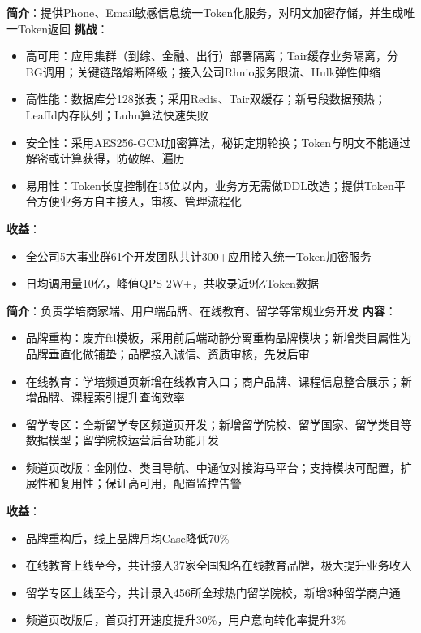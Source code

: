 \documentclass{resume}
\begin{document}
    \begin{onehalfspacing}
        \textbf{简介}：提供Phone、Email敏感信息统一Token化服务，对明文加密存储，并生成唯一Token返回\newline
        \textbf{挑战}：
        \begin{itemize}
            \item 高可用：应用集群（到综、金融、出行）部署隔离；Tair缓存业务隔离，分BG调用；关键链路熔断降级；接入公司Rhnio服务限流、Hulk弹性伸缩
            \item 高性能：数据库分128张表；采用Redis、Tair双缓存；新号段数据预热；LeafId内存队列；Luhn算法快速失败
            \item 安全性：采用AES256-GCM加密算法，秘钥定期轮换；Token与明文不能通过解密或计算获得，防破解、遍历
            \item 易用性：Token长度控制在15位以内，业务方无需做DDL改造；提供Token平台方便业务方自主接入，审核、管理流程化
        \end{itemize}
        \textbf{收益}：
        \begin{itemize}
            \item 全公司5大事业群61个开发团队共计300+应用接入统一Token加密服务
            \item 日均调用量10亿，峰值QPS 2W+，共收录近9亿Token数据
        \end{itemize}
    \end{onehalfspacing}
    \blankline{ }

    \begin{onehalfspacing}
        \textbf{简介}：负责学培商家端、用户端品牌、在线教育、留学等常规业务开发\newline
        \textbf{内容}：
        \begin{itemize}
            \item 品牌重构：废弃ftl模板，采用前后端动静分离重构品牌模块；新增类目属性为品牌垂直化做铺垫；品牌接入诚信、资质审核，先发后审
            \item 在线教育：学培频道页新增在线教育入口；商户品牌、课程信息整合展示；新增品牌、课程索引提升查询效率
            \item 留学专区：全新留学专区频道页开发；新增留学院校、留学国家、留学类目等数据模型；留学院校运营后台功能开发
            \item 频道页改版：金刚位、类目导航、中通位对接海马平台；支持模块可配置，扩展性和复用性；保证高可用，配置监控告警
        \end{itemize}
        \textbf{收益}：
        \begin{itemize}
            \item 品牌重构后，线上品牌月均Case降低70\%
            \item 在线教育上线至今，共计接入37家全国知名在线教育品牌，极大提升业务收入
            \item 留学专区上线至今，共计录入456所全球热门留学院校，新增3种留学商户通
            \item 频道页改版后，首页打开速度提升30\%，用户意向转化率提升3\%
        \end{itemize}
    \end{onehalfspacing}
    \blankline{ }
\end{document}
